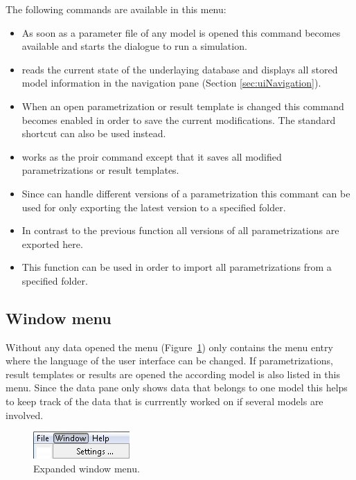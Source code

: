 The following commands are available in this menu:
\begin{itemize}
\item {} As soon as a parameter file of any model is opened this command becomes available and starts the dialogue to run a simulation.
\item {} reads the current state of the underlaying database and displays all stored model information in the navigation pane (\cf Section \ref{sec:uiNavigation}).
\item {} When an open parametrization or result template is changed this command becomes enabled in order to save the current modifications. The standard shortcut  can also be used instead.
\item {} works as the proir command except that it saves all modified parametrizations or result templates.
\item {} Since \RA{} can handle different versions of a parametrization this commant can be used for only exporting the latest version to a specified folder.
\item {} In contrast to the previous function all versions of all parametrizations are exported here.
\item {} This function can be used in order to import all parametrizations from a specified folder.
\end{itemize}

\subsection{Window menu}
\label{subsec:uiWindowMenu}

Without any data opened the  menu (\cf Figure~\ref{fig:menuWindow}) only contains the menu entry  where the language of the user interface can be changed. 
If parametrizations, result templates or results are opened the according model is also listed in this menu. Since the data pane only shows data that belongs to one model this helps to keep track of the data that is currrently worked on if several models are involved.
\begin{figure}[htb]
	\centering
		\includegraphics[scale=0.6]{images/menuWindow.png}
	\caption{Expanded window menu.}
	\label{fig:menuWindow}
\end{figure}

